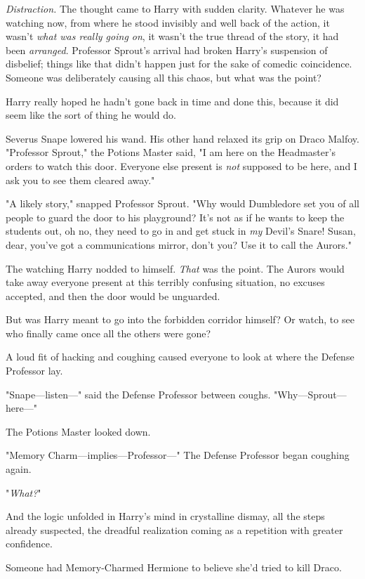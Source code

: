 \emph{Distraction.} The thought came to Harry with sudden clarity. Whatever he
was watching now, from where he stood invisibly and well back of the action, it
wasn't \emph{what was really going on}, it wasn't the true thread of the story,
it had been \emph{arranged}. Professor Sprout's arrival had broken Harry's
suspension of disbelief; things like that didn't happen just for the sake of
comedic coincidence. Someone was deliberately causing all this chaos, but what
was the point?

Harry really hoped he hadn't gone back in time and done this, because it did
seem like the sort of thing he would do.

Severus Snape lowered his wand. His other hand relaxed its grip on Draco Malfoy.
"Professor Sprout," the Potions Master said, "I am here on the Headmaster's
orders to watch this door. Everyone else present is \emph{not} supposed to be
here, and I ask you to see them cleared away."

"A likely story," snapped Professor Sprout. "Why would Dumbledore set you of
all people to guard the door to his playground? It's not as if he wants to keep
the students out, oh no, they need to go in and get stuck in \emph{my} Devil's
Snare! Susan, dear, you've got a communications mirror, don't you? Use it to
call the Aurors."

The watching Harry nodded to himself. \emph{That} was the point. The Aurors
would take away everyone present at this terribly confusing situation, no
excuses accepted, and then the door would be unguarded.

But was Harry meant to go into the forbidden corridor himself? Or watch, to see
who finally came once all the others were gone?

A loud fit of hacking and coughing caused everyone to look at where the Defense
Professor lay.

"Snape—listen—" said the Defense Professor between coughs.
"Why—Sprout—here—"

The Potions Master looked down.

"Memory Charm—implies—Professor—" The Defense Professor began coughing
again.

"\emph{What?}"

And the logic unfolded in Harry's mind in crystalline dismay, all the steps
already suspected, the dreadful realization coming as a repetition with greater
confidence.

Someone had Memory-Charmed Hermione to believe she'd tried to kill Draco.

